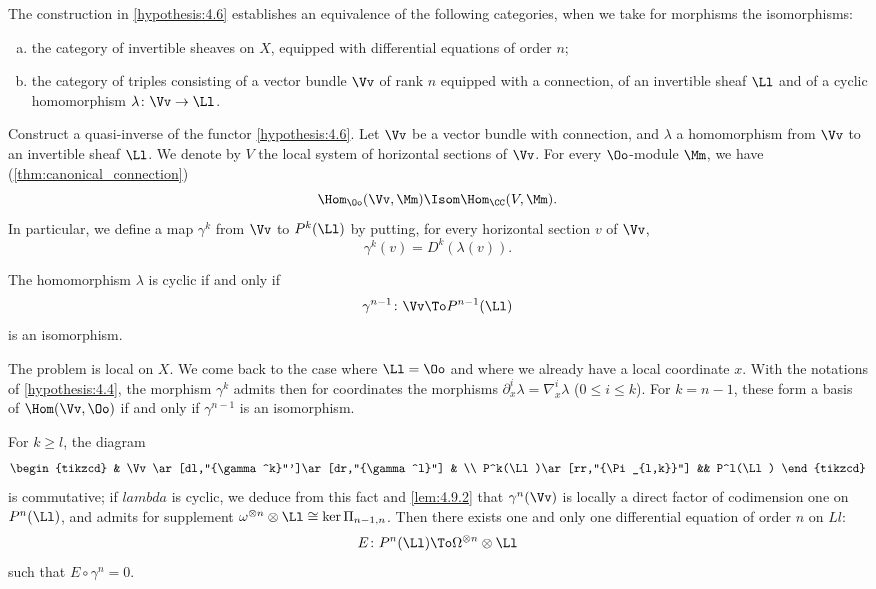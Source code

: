 \begin{proposition}\label{prop:4.9}
  The construction in \ref{hypothesis:4.6} establishes an equivalence of the
  following categories, when we take for morphisms the isomorphisms:
  \begin{enumerate}[a)]
    \item the category of invertible sheaves on $X$, equipped with differential
    equations of order $n$;
    \item the category of triples consisting of a vector bundle $\Vv$ of rank
    $n$ equipped with a connection, of an invertible sheaf $\Ll$ and
    of a cyclic homomorphism $\lambda\colon\Vv\to\Ll$.
  \end{enumerate}
\end{proposition}

Construct a quasi-inverse of the functor \ref{hypothesis:4.6}.
Let $\Vv$ be a vector bundle with connection, and $\lambda$ a homomorphism from
$\Vv$ to an invertible sheaf $\Ll$.
We denote by $V$ the local system of horizontal sections of $\Vv$. For every
$\Oo$-module $\Mm$, we have (\ref{thm:canonical_connection})
\[
\Hom_{\Oo}(\Vv,\Mm)\Isom\Hom_{\CC}(V,\Mm).
\]
In particular, we define a map $\gamma^k$ from $\Vv$ to $P^k(\Ll)$ by putting,
for every horizontal section $v$ of $\Vv$,
\begin{equation}\label{eq:4.9.1}
  \gamma^k(v) = D^k(\lambda(v)).
\end{equation}

\begin{sublemma}\label{lem:4.9.2}
  The homomorphism $\lambda$ is cyclic if and only if
  \[
  \gamma^{n-1}\colon\Vv\To P^{n-1}(\Ll)
  \]
  is an isomorphism.
\end{sublemma}

The problem is local on $X$. We come back to the case where $\Ll=\Oo$ and where
we already have a local coordinate $x$.
With the notations of \ref{hypothesis:4.4}, the morphism $\gamma^k$ admits then
for coordinates the morphisms $\partial_x^i\lambda = \nabla_x^i\lambda$
($0\le i\le k$).
For $k=n-1$, these form a basis of $\Hom(\Vv,\Oo)$ if and only if $\gamma^{n-1}$
is an isomorphism.


For $k\ge l$, the diagram
\begin{equation}\label{diag:4.9.3}
  \begin{tikzcd}
    & \Vv\ar[dl,"{\gamma^k}"']\ar[dr,"{\gamma^l}"] & \\
    P^k(\Ll)\ar[rr,"{\Pi_{l,k}}"] && P^l(\Ll)
  \end{tikzcd}
\end{equation}
is commutative; if $lambda$ is cyclic, we deduce from this fact and
\ref{lem:4.9.2} that $\gamma^n(\Vv)$ is locally a direct factor of codimension
one on $P^n(\Ll)$, and admits for supplement
$\omega^{\otimes n}\otimes\Ll\cong\ker{\Pi_{n-1,n}}$.
Then there exists one and only one differential equation of order $n$ on $Ll$:
\[
E\colon P^n(\Ll) \To \Omega^{\otimes n}\otimes\Ll
\]
such that $E\circ\gamma^n = 0$.

